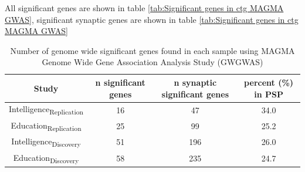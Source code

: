 All significant genes are shown in table \ref{tab:Significant genes in ctg MAGMA GWAS}, significant synaptic genes are shown in table \ref{tab:Significant genes in ctg MAGMA GWAS}

\begin{table}[ht]
    \centering
    \begin{tabular}{cccc}
    \toprule
         Study & n significant genes & n synaptic significant genes & percent (\%) in PSP \\
      \midrule  
         Intelligence\textsubscript{Replication}\cite{sniekers2017genome} & 16 & 47 & 34.0 \\
         Education\textsubscript{Replication}\cite{okbay2016genome} & 25 & 99 & 25.2 \\
         Intelligence\textsubscript{Discovery}\cite{hill2019combined} & 51 & 196 & 26.0\\
         Education\textsubscript{Discovery}\cite{hill2019combined} & 58 & 235 & 24.7\\
         \bottomrule
    \end{tabular}
    \caption{Number of genome wide significant genes found in each sample using MAGMA Genome Wide Gene Association Analysis Study  (GWGWAS)}
    \label{tab:significant genes}
\end{table}

